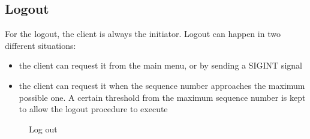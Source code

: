 \subsection{Logout}
For the logout, the client is always the initiator.
Logout can happen in two different situations:
\begin{itemize}
    \item the client can request it from the main menu, or by sending a SIGINT signal
    \item the client can request it when the sequence number approaches the maximum possible one. A certain threshold from the maximum sequence number is kept to allow the logout procedure to execute
\end{itemize}
\begin{figure}
    \centering
    \setlength{\instdist}{8.5cm}
    \setmscoptions
    \begin{msc}{}



        \nextlevel[2]

        \nextlevel[3]

        \nextlevel

        \nextlevel[3]

        \nextlevel
        \nextlevel[2]
    \end{msc}
    \centering
    \caption{Log out}
    \label{fig:transport_protocol_log_out}
\end{figure}
